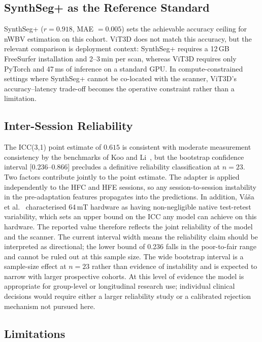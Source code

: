 \documentclass[12pt,a4paper]{article}
\begin{document}
\subsection{SynthSeg+ as the Reference Standard}

SynthSeg+ ($r = 0.918$, MAE $= 0.005$) sets the achievable accuracy
ceiling for nWBV estimation on this cohort. ViT3D does not match this
accuracy, but the relevant comparison is deployment context: SynthSeg+
requires a 12\,GB FreeSurfer installation and 2--3\,min per scan,
whereas ViT3D requires only PyTorch and 47\,ms of inference on a
standard GPU. In compute-constrained settings where SynthSeg+ cannot
be co-located with the scanner, ViT3D's accuracy--latency trade-off
becomes the operative
constraint rather than a limitation.

\subsection{Inter-Session Reliability}
\label{sec:discussion_icc}

The ICC(3,1) point estimate of $0.615$ is consistent with moderate
measurement consistency by the benchmarks of Koo and
Li~\cite{koo2016icc}, but the bootstrap confidence interval
[0.236--0.866] precludes a definitive reliability classification at
$n = 23$. Two factors contribute jointly to the point estimate. The
adapter is applied independently to the HFC and HFE sessions, so any
session-to-session instability in the pre-adaptation features
propagates into the predictions. In addition, V{\'a}{\v s}a et
al.~\cite{vasa2025imaneur} characterised 64\,mT hardware as having
non-negligible native test-retest variability, which sets an upper
bound on the ICC any model can achieve on this hardware. The reported
value therefore reflects the joint reliability of the model and the
scanner. The current interval width means the reliability claim should
be interpreted as directional; the lower bound of 0.236 falls in the
poor-to-fair range and cannot be ruled out at this sample size. The
wide bootstrap interval is a sample-size effect at $n = 23$ rather
than evidence of instability and is expected to narrow with larger
prospective cohorts. At this level of evidence the model is
appropriate for group-level or longitudinal research use; individual
clinical decisions would require either a larger reliability study or
a calibrated rejection mechanism not pursued here.

\subsection{Limitations}
\label{sec:limitations}
\end{document}
